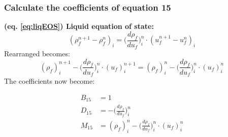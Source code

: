 \documentclass[11pt,letterpaper,titlepage]{article}
\begin{document}
\vspace{0.5in}
\subsubsection{Calculate the coefficients of equation 15}
\textbf{(eq. \ref{eq:liqEOS}) Liquid equation of state:}
\begin{equation*} 
(\rho_{f}^{n+1} - \rho_{f}^{n})_i= \biggr( \frac{d\rho_f}{du_f} \biggr)_i^n \cdot (u_{f}^{n+1} - u_{f}^{n})_i
\end{equation*}
Rearranged becomes:
\begin{equation*} 
(\rho_f)_i^{n+1} - \biggr( \frac{d\rho_f}{du_f} \biggr)_i^n \cdot (u_f)_i^{n+1} =  (\rho_f)_i^{n} - \biggr( \frac{d\rho_f}{du_f} \biggr)_i^n \cdot (u_f)_i^n
\end{equation*}
\newline
The coefficients now become:

\begin{equation*}
\begin{aligned}
B_{15} & = 1 \\
D_{15} & = - \biggr( \frac{d\rho_f}{du_f} \biggr)_i^n \\
M_{15} & = (\rho_f)_i^{n} - \biggr( \frac{d\rho_f}{du_f} \biggr)_i^n \cdot (u_f)_i^n
\end{aligned}
\end{equation*}













\newpage
{}
\end{document}
